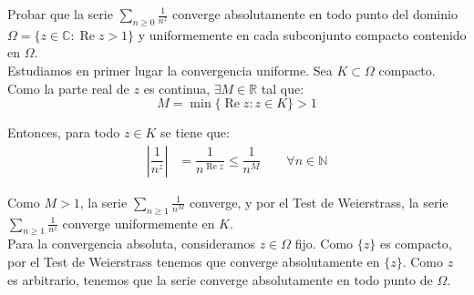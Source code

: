 \documentclass[12pt]{article}
\renewcommand{\Re}{\operatorname{Re}} %
\begin{document}
    \newpage
    \setcounter{ejercicio}{0}

    \begin{ejercicio}[3.5 puntos]
        Probar que la serie $\displaystyle \sum\limits_{n \geq 0} \frac{1}{n^z}$ converge absolutamente en todo punto del dominio $\Omega = \{z \in \mathbb{C} : \Re z > 1\}$ y uniformemente en cada subconjunto compacto contenido en $\Omega$.\\


        Estudiamos en primer lugar la convergencia uniforme. Sea $K\subset \Omega$ compacto. Como la parte real de $z$ es continua, $\exists M\in \mathbb{R}$ tal que:
        \begin{equation*}
            M=\min\{\Re z : z\in K\} > 1
        \end{equation*}
        
        Entonces, para todo $z\in K$ se tiene que:
        \begin{align*}
            \left|\dfrac{1}{n^z}\right| &= \dfrac{1}{n^{\Re z}} \leq \dfrac{1}{n^M} \qquad \forall n\in \mathbb{N}
        \end{align*}

        Como $M> 1$, la serie $\displaystyle \sum_{n\geq 1} \frac{1}{n^M}$ converge, y por el Test de Weierstrass, la serie $\displaystyle \sum_{n\geq 1} \frac{1}{n^z}$ converge uniformemente en $K$.\\

        Para la convergencia absoluta, consideramos $z\in \Omega$ fijo. Como $\{z\}$ es compacto, por el Test de Weierstrass tenemos que converge absolutamente en $\{z\}$. Como $z$ es arbitrario, tenemos que la serie converge absolutamente en todo punto de $\Omega$.
    \end{ejercicio}
\end{document}
